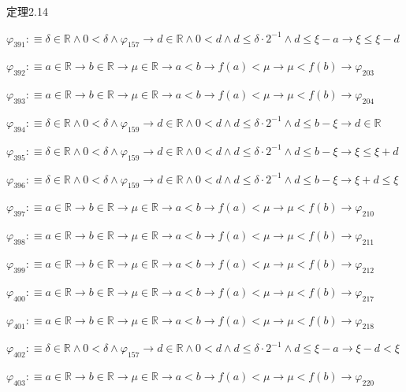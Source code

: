 \begin{fullproof}{定理2.14}
\begin{abbrevlist}
\item $\varphi_{391} :\equiv \delta \in \mathbb{R} \land 0 < \delta \land \varphi_{157} \to d \in \mathbb{R} \land 0 < d \land d \leq \delta \cdot 2^{-1} \land d \leq \xi - a \to \xi \leq \xi - d$
\item $\varphi_{392} :\equiv a \in \mathbb{R} \to b \in \mathbb{R} \to \mu \in \mathbb{R} \to a < b \to f(a) < \mu \to \mu < f(b) \to \varphi_{203}$
\item $\varphi_{393} :\equiv a \in \mathbb{R} \to b \in \mathbb{R} \to \mu \in \mathbb{R} \to a < b \to f(a) < \mu \to \mu < f(b) \to \varphi_{204}$
\item $\varphi_{394} :\equiv \delta \in \mathbb{R} \land 0 < \delta \land \varphi_{159} \to d \in \mathbb{R} \land 0 < d \land d \leq \delta \cdot 2^{-1} \land d \leq b - \xi \to d \in \mathbb{R}$
\item $\varphi_{395} :\equiv \delta \in \mathbb{R} \land 0 < \delta \land \varphi_{159} \to d \in \mathbb{R} \land 0 < d \land d \leq \delta \cdot 2^{-1} \land d \leq b - \xi \to \xi \leq \xi + d$
\item $\varphi_{396} :\equiv \delta \in \mathbb{R} \land 0 < \delta \land \varphi_{159} \to d \in \mathbb{R} \land 0 < d \land d \leq \delta \cdot 2^{-1} \land d \leq b - \xi \to \xi + d \leq \xi$
\item $\varphi_{397} :\equiv a \in \mathbb{R} \to b \in \mathbb{R} \to \mu \in \mathbb{R} \to a < b \to f(a) < \mu \to \mu < f(b) \to \varphi_{210}$
\item $\varphi_{398} :\equiv a \in \mathbb{R} \to b \in \mathbb{R} \to \mu \in \mathbb{R} \to a < b \to f(a) < \mu \to \mu < f(b) \to \varphi_{211}$
\item $\varphi_{399} :\equiv a \in \mathbb{R} \to b \in \mathbb{R} \to \mu \in \mathbb{R} \to a < b \to f(a) < \mu \to \mu < f(b) \to \varphi_{212}$
\item $\varphi_{400} :\equiv a \in \mathbb{R} \to b \in \mathbb{R} \to \mu \in \mathbb{R} \to a < b \to f(a) < \mu \to \mu < f(b) \to \varphi_{217}$
\item $\varphi_{401} :\equiv a \in \mathbb{R} \to b \in \mathbb{R} \to \mu \in \mathbb{R} \to a < b \to f(a) < \mu \to \mu < f(b) \to \varphi_{218}$
\item $\varphi_{402} :\equiv \delta \in \mathbb{R} \land 0 < \delta \land \varphi_{157} \to d \in \mathbb{R} \land 0 < d \land d \leq \delta \cdot 2^{-1} \land d \leq \xi - a \to \xi - d < \xi$
\item $\varphi_{403} :\equiv a \in \mathbb{R} \to b \in \mathbb{R} \to \mu \in \mathbb{R} \to a < b \to f(a) < \mu \to \mu < f(b) \to \varphi_{220}$

\end{abbrevlist}
\end{fullproof}
